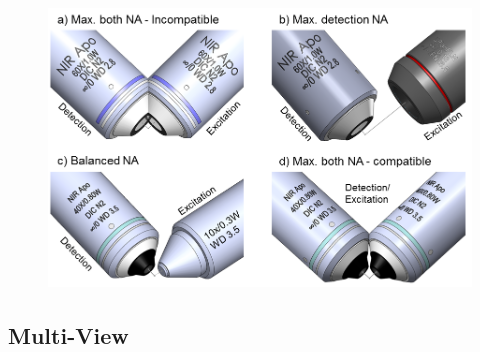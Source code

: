 \begin{figure}
	\includegraphics[width=\columnwidth]{objectivecompatibility}
	\label{fig:objectivecompatibility}
	\caption{}
\end{figure}





\subsection{Multi-View}%

